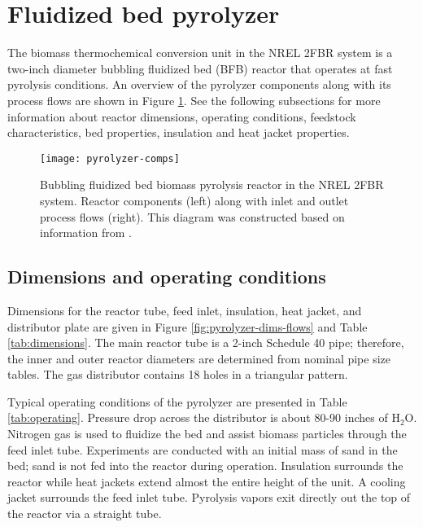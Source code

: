 
\section{Fluidized bed pyrolyzer}

The biomass thermochemical conversion unit in the NREL 2FBR system is a two-inch diameter bubbling fluidized bed (BFB) reactor that operates at fast pyrolysis conditions. An overview of the pyrolyzer components along with its process flows are shown in Figure \ref{fig:pyrolyzer-comps}. See the following subsections for more information about reactor dimensions, operating conditions, feedstock characteristics, bed properties, insulation and heat jacket properties.

\begin{figure}[H]
    \centering
    \texttt{[image: pyrolyzer-comps]}
    \caption{Bubbling fluidized bed biomass pyrolysis reactor in the NREL 2FBR system. Reactor components (left) along with inlet and outlet process flows (right). This diagram was constructed based on information from \cite{French-2019}.}
    \label{fig:pyrolyzer-comps}
\end{figure}

\subsection{Dimensions and operating conditions}

Dimensions for the reactor tube, feed inlet, insulation, heat jacket, and distributor plate are given in Figure \ref{fig:pyrolyzer-dims-flows} and Table \ref{tab:dimensions}. The main reactor tube is a 2-inch Schedule 40 pipe; therefore, the inner and outer reactor diameters are determined from nominal pipe size tables. The gas distributor contains 18 holes in a triangular pattern.

Typical operating conditions of the pyrolyzer are presented in Table \ref{tab:operating}. Pressure drop across the distributor is about 80-90 inches of H$_2$O. Nitrogen gas is used to fluidize the bed and assist biomass particles through the feed inlet tube. Experiments are conducted with an initial mass of sand in the bed; sand is not fed into the reactor during operation. Insulation surrounds the reactor while heat jackets extend almost the entire height of the unit. A cooling jacket surrounds the feed inlet tube. Pyrolysis vapors exit directly out the top of the reactor via a straight tube.

